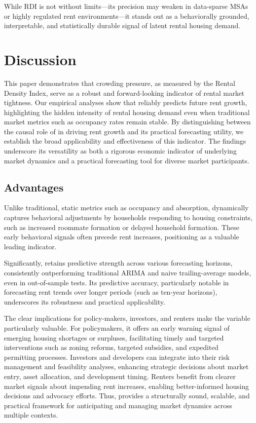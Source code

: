 \documentclass[APA,Times1COL]{WileyNJDv5} %
\begin{document}
While RDI is not without limits---its precision may weaken in data-sparse MSAs or highly regulated rent environments---it stands out as a behaviorally grounded, interpretable, and statistically durable signal of latent rental housing demand.


\section{Discussion}
This paper demonstrates that crowding pressure, as measured by the Rental Density Index, serve as a robust and forward-looking indicator of rental market tightness. Our empirical analyses show that  reliably predicts future rent growth, highlighting the hidden intensity of rental housing demand even when traditional market metrics such as occupancy rates remain stable. By distinguishing between the causal role of  in driving rent growth and its practical forecasting utility, we establish the broad applicability and effectiveness of this indicator. The findings underscore its versatility as both a rigorous economic indicator of underlying market dynamics and a practical forecasting tool for diverse market participants.

\subsection{Advantages}
Unlike traditional, static metrics such as occupancy and absorption,  dynamically captures behavioral adjustments by households responding to housing constraints, such as increased roommate formation or delayed household formation. These early behavioral signals often precede rent increases, positioning  as a valuable leading indicator.

Significantly,  retains predictive strength across various forecasting horizons, consistently outperforming traditional ARIMA and naive trailing-average models, even in out-of-sample tests. Its predictive accuracy, particularly notable in forecasting rent trends over longer periods (such as ten-year horizons), underscores its robustness and practical applicability.

The clear implications for policy-makers, investors, and renters make the variable particularly valuable. For policymakers, it offers an early warning signal of emerging housing shortages or surpluses, facilitating timely and targeted interventions such as zoning reforms, targeted subsidies, and expedited permitting processes. Investors and developers can integrate  into their risk management and feasibility analyses, enhancing strategic decisions about market entry, asset allocation, and development timing. Renters benefit from clearer market signals about impending rent increases, enabling better-informed housing decisions and advocacy efforts. Thus,  provides a structurally sound, scalable, and practical framework for anticipating and managing market dynamics across multiple contexts.
\end{document}

